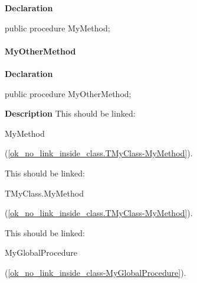 \documentclass{report}
\newif\ifpdf
\begin{document}
\label{ok_no_link_inside_class.TMyClass-MyMethod}
\begin{list}{}{
\setlength{\itemindent}{0cm}
\setlength{\listparindent}{0cm}
\setlength{\leftmargin}{\evensidemargin}
\addtolength{\leftmargin}{\tmplength}
\settowidth{\labelsep}{X}
\addtolength{\leftmargin}{\labelsep}
\setlength{\labelwidth}{\tmplength}
}
\item[\textbf{Declaration}\hfill]
\ifpdf
\begin{flushleft}
\fi
\begin{ttfamily}
public procedure MyMethod;\end{ttfamily}

\ifpdf
\end{flushleft}
\fi

\end{list}
\paragraph*{MyOtherMethod}\hspace*{\fill}

\label{ok_no_link_inside_class.TMyClass-MyOtherMethod}
\begin{list}{}{
\setlength{\itemindent}{0cm}
\setlength{\listparindent}{0cm}
\setlength{\leftmargin}{\evensidemargin}
\addtolength{\leftmargin}{\tmplength}
\settowidth{\labelsep}{X}
\addtolength{\leftmargin}{\labelsep}
\setlength{\labelwidth}{\tmplength}
}
\item[\textbf{Declaration}\hfill]
\ifpdf
\begin{flushleft}
\fi
\begin{ttfamily}
public procedure MyOtherMethod;\end{ttfamily}

\ifpdf
\end{flushleft}
\fi

\par
\item[\textbf{Description}]
This should be linked: \begin{ttfamily}MyMethod\end{ttfamily}(\ref{ok_no_link_inside_class.TMyClass-MyMethod}).

This should be linked: \begin{ttfamily}TMyClass.MyMethod\end{ttfamily}(\ref{ok_no_link_inside_class.TMyClass-MyMethod}).

This should be linked: \begin{ttfamily}MyGlobalProcedure\end{ttfamily}(\ref{ok_no_link_inside_class-MyGlobalProcedure}).

\end{list}
\end{document}
